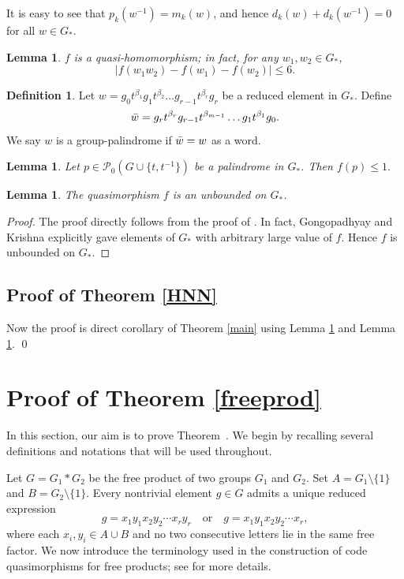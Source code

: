 \documentclass[12pt]{amsart}
\newtheorem{lemma}[theorem]{Lemma}
\theoremstyle{definition}
\newtheorem{definition}[theorem]{Definition}
\theoremstyle{remark}
\numberwithin{equation}{subsection}
\theoremstyle{plain}
\numberwithin{equation}{section}
\begin{document}
It is easy to see that $p_k(w^{-1}) = m_k(w)$, and hence $d_k(w) + d_k(w^{-1}) = 0$ for all $w \in G_*.$

 \begin{lemma}\cite[Lemma~9]{bardakov1997width}\label{hnnquasilemma}
 $f$ is a quasi-homomorphism; in fact, for any $w_1,w_2 \in G_*$, $$|f(w_1w_2) - f(w_1) - f(w_2)| \leq 6.$$
 \end{lemma}

\begin{definition}
    Let $w = g_0t^{\beta_1}g_1t^{\beta_2}\ldots g_{r-1}t^{\beta_{r}}g_r$ be a reduced element in $G_*$. Define $$\Bar{w} = g_rt^{\beta_r}g_{r-1}t^{\beta_{m-1}}\ldots g_1t^{\beta_{1}}g_0.$$
    We say $w$ is a group-palindrome if $\Bar{w} = w$ as a word.
\end{definition}

 \begin{lemma}\cite[Lemma~2.7]{GK}\label{hnnpali}
     Let $p \in \mathcal{P}_0(G \cup \{t, t^{-1}\})$ be a palindrome in $G_*$. Then $f(p) \leq 1. $
 \end{lemma}

 \begin{lemma}\label{hnnunbound}
     The quasimorphism $f$ is an unbounded on $G_*$.
 \end{lemma}

 \begin{proof}
     The proof directly follows from the proof of \cite[Theorem~1.1]{GK}. In fact, Gongopadhyay and Krishna explicitly gave elements of $G_*$ with arbitrary large value of $f$. Hence $f$ is unbounded on $G_*$.
 \end{proof}

 
 \subsection{Proof of Theorem \ref{HNN}}
     Now the proof is direct corollary of Theorem \ref{main} using Lemma \ref{hnnpali} and Lemma \ref{hnnunbound}.
\qed

 
\section{Proof of Theorem \ref{freeprod}}

In this section, our aim is to prove Theorem~. We begin by recalling several definitions and notations that will be used throughout.

 Let $G = G_1 * G_2$ be the free product of two groups $G_1$ and $G_2$.  
Set $A = G_1 \setminus \{1\}$ and $B = G_2 \setminus \{1\}$.  
Every nontrivial element $g \in G$ admits a unique reduced expression
\[
g = x_1 y_1 x_2 y_2 \cdots x_r y_r \quad \text{or} \quad 
g = x_1 y_1 x_2 y_2 \cdots x_r,
\]
where each $x_i, y_i \in A \cup B$ and no two consecutive letters lie in the same free factor.  
We now introduce the terminology used in the construction of code quasimorphisms for free products; see \cite{KB} for more details.
\end{document}
